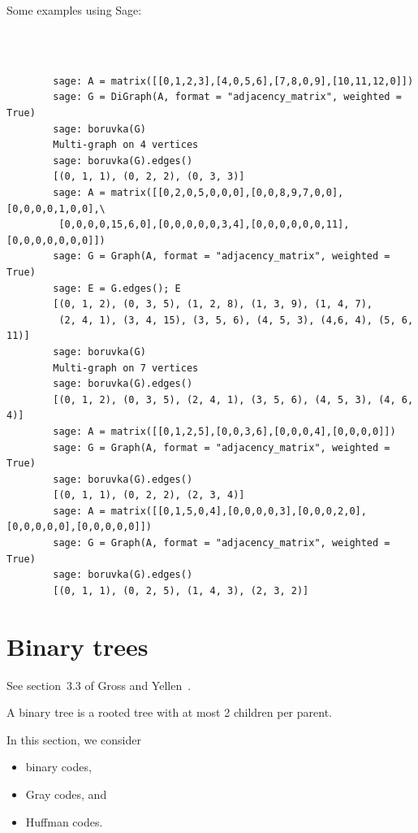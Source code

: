 Some examples using Sage:


\begin{center}
\fontsize{9pt}{9pt}
\selectfont
\tt
\begin{lstlisting}

        sage: A = matrix([[0,1,2,3],[4,0,5,6],[7,8,0,9],[10,11,12,0]])
        sage: G = DiGraph(A, format = "adjacency_matrix", weighted = True)
        sage: boruvka(G)
        Multi-graph on 4 vertices
        sage: boruvka(G).edges()
        [(0, 1, 1), (0, 2, 2), (0, 3, 3)]
        sage: A = matrix([[0,2,0,5,0,0,0],[0,0,8,9,7,0,0],[0,0,0,0,1,0,0],\
         [0,0,0,0,15,6,0],[0,0,0,0,0,3,4],[0,0,0,0,0,0,11],[0,0,0,0,0,0,0]])
        sage: G = Graph(A, format = "adjacency_matrix", weighted = True)
        sage: E = G.edges(); E
        [(0, 1, 2), (0, 3, 5), (1, 2, 8), (1, 3, 9), (1, 4, 7),
         (2, 4, 1), (3, 4, 15), (3, 5, 6), (4, 5, 3), (4,6, 4), (5, 6, 11)]
        sage: boruvka(G)
        Multi-graph on 7 vertices
        sage: boruvka(G).edges()
        [(0, 1, 2), (0, 3, 5), (2, 4, 1), (3, 5, 6), (4, 5, 3), (4, 6, 4)]
        sage: A = matrix([[0,1,2,5],[0,0,3,6],[0,0,0,4],[0,0,0,0]])
        sage: G = Graph(A, format = "adjacency_matrix", weighted = True)
        sage: boruvka(G).edges()
        [(0, 1, 1), (0, 2, 2), (2, 3, 4)]
        sage: A = matrix([[0,1,5,0,4],[0,0,0,0,3],[0,0,0,2,0],[0,0,0,0,0],[0,0,0,0,0]])
        sage: G = Graph(A, format = "adjacency_matrix", weighted = True)
        sage: boruvka(G).edges()
        [(0, 1, 1), (0, 2, 5), (1, 4, 3), (2, 3, 2)]

\end{lstlisting}
\end{center}
%


\section{Binary trees}

See section~3.3 of Gross and Yellen~\cite{GrossYellen1999}.

A binary tree is a rooted tree with at most 2 children per parent.

In this section, we consider

\begin{itemize}
\item binary codes,

\item Gray codes, and

\item Huffman codes.
\end{itemize}

